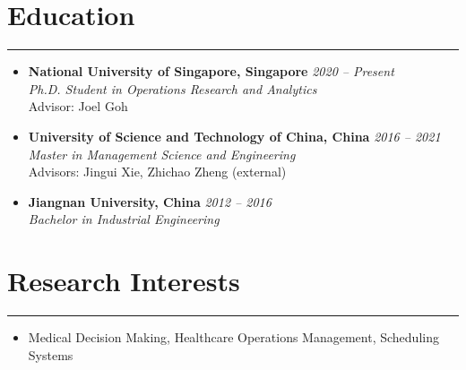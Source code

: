 \documentclass[12pt, a4paper]{article}
\begin{document}
{\small

\section*{Education}
\vspace*{0.4em}
\hrule height 0.4pt
 \begin{itemize}[leftmargin=20pt, itemsep=6pt, parsep=0.2pt, topsep=1pt]

	\item[] \textbf{National University of Singapore, Singapore} \hfill \textit{2020 -- Present} \\
	\textit{Ph.D. Student in Operations Research and Analytics} \\
	Advisor: Joel Goh

	\item[] \textbf{University of Science and Technology of China, China} \hfill \textit{2016 -- 2021} \\
	\textit{Master in Management Science and Engineering} \\
	Advisors: Jingui Xie, Zhichao Zheng (external)

	\item[] \textbf{Jiangnan University, China} \hfill \textit{2012 -- 2016} \\
	\textit{Bachelor in Industrial Engineering}

\end{itemize}




\section*{Research Interests}
\vspace*{0.4em}
\hrule height 0.5pt
\begin{itemize}[leftmargin=20pt, itemsep=6pt, parsep=0.2pt, topsep=1pt]

	\item[] Medical Decision Making, Healthcare Operations Management, Scheduling Systems

\end{itemize}



}
\end{document}
